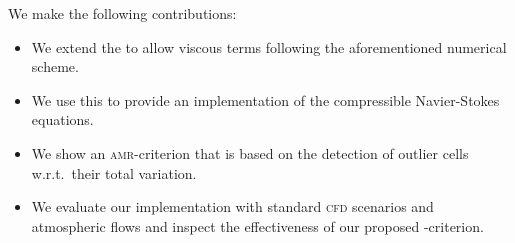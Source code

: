 \documentclass[runningheads]{llncs}
\begin{document}
We make the following contributions:
\begin{itemize}%
\item We extend the \exahypeengine{} to allow viscous terms following the aforementioned numerical scheme.
\item We use this to provide an implementation of the compressible Navier-Stokes equations.
\item We show an \textsc{amr}-criterion that is based on the detection of outlier cells w.r.t.\ their total variation.
\item We evaluate our implementation with standard \textsc{cfd} scenarios and atmospheric flows and inspect the effectiveness of our proposed \amr{}-criterion.
\end{itemize}
\end{document}
